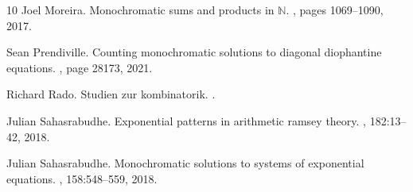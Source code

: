 \begin{thebibliography}{10}
Joel Moreira.
\newblock Monochromatic sums and products in $\mathbb{N}$.
, pages 1069--1090, 2017.

Sean Prendiville.
\newblock Counting monochromatic solutions to diagonal diophantine equations.
, page 28173, 2021.

Richard Rado.
\newblock Studien zur kombinatorik.
.

Julian Sahasrabudhe.
\newblock Exponential patterns in arithmetic ramsey theory.
, 182:13--42, 2018.

Julian Sahasrabudhe.
\newblock Monochromatic solutions to systems of exponential equations.
, 158:548--559, 2018.

\end{thebibliography}
